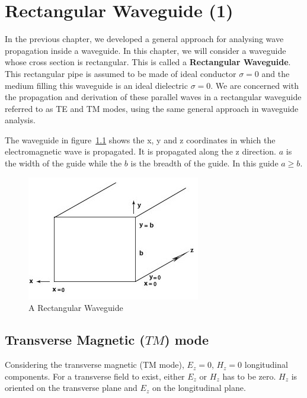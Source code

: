 \chapter{Rectangular Waveguide (1)}
In the previous chapter, we developed a general approach for analysing wave propagation inside a waveguide. In this chapter, we will consider a waveguide whose cross section is rectangular. This is called a \textbf{Rectangular Waveguide}. This rectangular pipe is assumed to be made of ideal conductor $\sigma = 0$ and the medium filling this waveguide is an ideal dielectric $\sigma = 0$. We are concerned with the propagation and derivation of these parallel waves in a rectangular waveguide referred to as TE and TM modes, using the same general approach in waveguide analysis.

The waveguide in figure~\ref{fig:lec38fig1} shows the x, y and z coordinates in which the electromagnetic wave is propagated. It is propagated along the z direction. $a$ is the width of the guide while the $b$ is the breadth of the guide. In this guide $a \geq b$.

\begin{figure}[h]
\centering
\includegraphics[width=0.7\linewidth]{./graphics/lec38fig1}
\caption{A Rectangular Waveguide}
\label{fig:lec38fig1}
\end{figure}

\section{Transverse Magnetic ($TM$) mode}
Considering the transverse magnetic (TM mode), $ E_{z} = 0$, $H_{z} = 0 $ longitudinal components. For a transverse field to exist, either $ E_{z} $ or $ H_{z} $ has to be zero. $ H_{z} $ is oriented on the transverse plane and $ E_{z} $ on the longitudinal plane.

